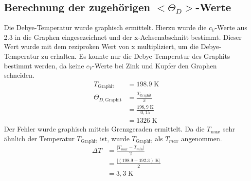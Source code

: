 \documentclass[12pt,a4paper,titlepage,headinclude,bibtotoc]{scrartcl}
\begin{document}
\subsection{Berechnung der zugehörigen $<\Theta_D>$-Werte }
Die Debye-Temperatur wurde graphisch ermittelt. Hierzu wurde die $c_V$-Werte aus 2.3 in die Graphen eingesezeichnet und der x-Achsenabschnitt bestimmt. Dieser Wert wurde mit dem reziproken Wert von x multipliziert, um die Debye-Temperatur zu erhalten. Es konnte nur die Debye-Temperatur des Graphits bestimmt werden, da keine $c_V$-Werte bei Zink und Kupfer den Graphen schneiden.
\begin{align}
T_{\text{Graphit}} &= 198.9\;\text{K}\\
\Theta_{D, \text{Graphit}} &= \frac{T_{\text{Graphit}}}{x}\\
&= \frac{198,9\;\text{K}}{0,15}\\
&= 1326\;\text{K}
\end{align}
Der Fehler wurde graphisch mittels Grenzgeraden ermittelt. Da die $T_{max}$ sehr ähnlich der Temperatur $T_{\text{Graphit}}$ ist, wurde $T_{\text{Graphit}}$ als $T_{max}$ angenommen. 
\begin{align}
\Delta T&= \frac{|T_{max} - T_{min}|}{2} \\
&= \frac{|(198.9-192.3)\;\text{K}|}{2}\\
&= 3,3\;\text{K}
\end{align}






\end{document}
